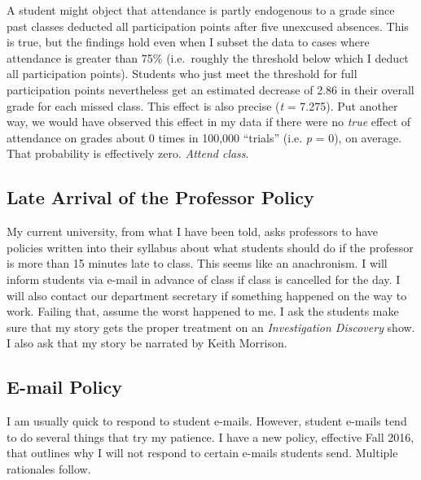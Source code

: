 \documentclass[11pt,]{article}
\begin{document}
A student might object that attendance is partly endogenous to a grade
since past classes deducted all participation points after five
unexcused absences. This is true, but the findings hold even when I
subset the data to cases where attendance is greater than 75\%
(i.e.~roughly the threshold below which I deduct all participation
points). Students who just meet the threshold for full participation
points nevertheless get an estimated decrease of 2.86 in their overall
grade for each missed class. This effect is also precise (\emph{t} =
7.275). Put another way, we would have observed this effect in my data
if there were no \emph{true} effect of attendance on grades about 0
times in 100,000 ``trials'' (i.e. \emph{p} = 0), on average. That
probability is effectively zero. \emph{Attend class}.

\subsection{Late Arrival of the Professor
Policy}\label{late-arrival-of-the-professor-policy}

My current university, from what I have been told, asks professors to
have policies written into their syllabus about what students should do
if the professor is more than 15 minutes late to class. This seems like
an anachronism. I will inform students via e-mail in advance of class if
class is cancelled for the day. I will also contact our department
secretary if something happened on the way to work. Failing that, assume
the worst happened to me. I ask the students make sure that my story
gets the proper treatment on an \emph{Investigation Discovery} show. I
also ask that my story be narrated by Keith Morrison.

\subsection{E-mail Policy}\label{e-mail-policy}

I am usually quick to respond to student e-mails. However, student
e-mails tend to do several things that try my patience. I have a new
policy, effective Fall 2016, that outlines why I will not respond to
certain e-mails students send. Multiple rationales follow.
\end{document}
